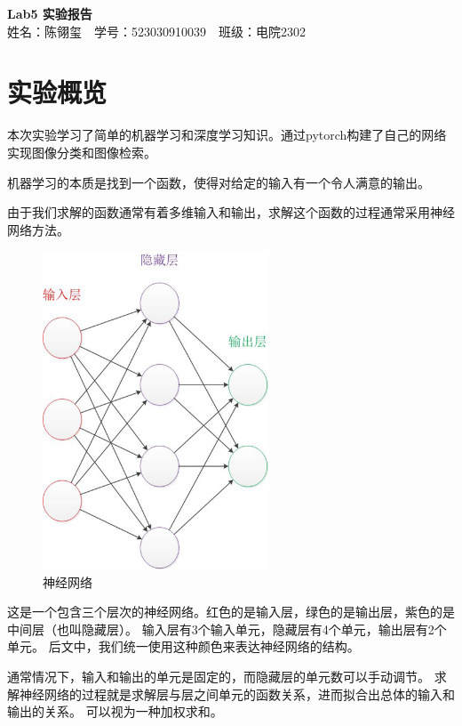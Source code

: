 \documentclass{article}
\begin{document}
\begin{center}
    \Large \textbf{Lab5 实验报告}\\
    \vspace{1em}
    姓名：陈翎玺~~学号：523030910039~~班级：电院2302
\end{center}

\section{实验概览}

    本次实验学习了简单的机器学习和深度学习知识。通过pytorch构建了自己的网络实现图像分类和图像检索。

    机器学习的本质是找到一个函数，使得对给定的输入有一个令人满意的输出。

    由于我们求解的函数通常有着多维输入和输出，求解这个函数的过程通常采用神经网络方法。

\begin{figure}[h]
\centering
\includegraphics[width=0.6\textwidth]{figure/img1}
\caption{神经网络}
\end{figure}

    这是一个包含三个层次的神经网络。红色的是输入层，绿色的是输出层，紫色的是中间层（也叫隐藏层）。
    输入层有3个输入单元，隐藏层有4个单元，输出层有2个单元。
    后文中，我们统一使用这种颜色来表达神经网络的结构。

    通常情况下，输入和输出的单元是固定的，而隐藏层的单元数可以手动调节。
    求解神经网络的过程就是求解层与层之间单元的函数关系，进而拟合出总体的输入和输出的关系。
    可以视为一种加权求和。
\end{document}
